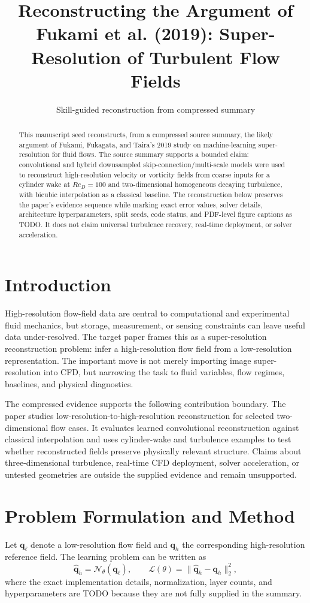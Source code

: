 \documentclass[11pt]{article}
\title{Reconstructing the Argument of Fukami et al. (2019): Super-Resolution of Turbulent Flow Fields}
\author{Skill-guided reconstruction from compressed summary}
\date{}
\begin{document}
\maketitle

\begin{abstract}
This manuscript seed reconstructs, from a compressed source summary, the likely argument of Fukami, Fukagata, and Taira's 2019 study on machine-learning super-resolution for fluid flows. The source summary supports a bounded claim: convolutional and hybrid downsampled skip-connection/multi-scale models were used to reconstruct high-resolution velocity or vorticity fields from coarse inputs for a cylinder wake at $Re_D=100$ and two-dimensional homogeneous decaying turbulence, with bicubic interpolation as a classical baseline. The reconstruction below preserves the paper's evidence sequence while marking exact error values, solver details, architecture hyperparameters, split seeds, code status, and PDF-level figure captions as TODO. It does not claim universal turbulence recovery, real-time deployment, or solver acceleration.
\end{abstract}

\section{Introduction}
High-resolution flow-field data are central to computational and experimental fluid mechanics, but storage, measurement, or sensing constraints can leave useful data under-resolved. The target paper frames this as a super-resolution reconstruction problem: infer a high-resolution flow field from a low-resolution representation. The important move is not merely importing image super-resolution into CFD, but narrowing the task to fluid variables, flow regimes, baselines, and physical diagnostics.

The compressed evidence supports the following contribution boundary. The paper studies low-resolution-to-high-resolution reconstruction for selected two-dimensional flow cases. It evaluates learned convolutional reconstruction against classical interpolation and uses cylinder-wake and turbulence examples to test whether reconstructed fields preserve physically relevant structure. Claims about three-dimensional turbulence, real-time CFD deployment, solver acceleration, or untested geometries are outside the supplied evidence and remain unsupported.

\section{Problem Formulation and Method}
Let $\mathbf{q}_{\ell}$ denote a low-resolution flow field and $\mathbf{q}_{h}$ the corresponding high-resolution reference field. The learning problem can be written as
\begin{equation}
\hat{\mathbf{q}}_{h}=\mathcal{N}_{\theta}(\mathbf{q}_{\ell}), \qquad
\mathcal{L}(\theta)=\|\hat{\mathbf{q}}_{h}-\mathbf{q}_{h}\|_2^2,
\end{equation}
where the exact implementation details, normalization, layer counts, and hyperparameters are TODO because they are not fully supplied in the summary.
\end{document}
